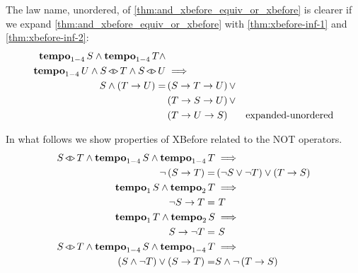 \documentclass[12pt,openright,twoside,a4paper,oldfontcommands,english,brazil,final]{abntex2}
\theoremstyle{theo}
\def\xbeforeop{\ensuremath\rightarrow}
\newcommand{\xbefore}[2]{\ensuremath #1 \xbeforeop #2 }
\def\tempoop{\ensuremath\operatorname{\mathbf{tempo}}}
\newcommand{\tempo}[2][1-4]{\ensuremath\tempoop_{#1} #2}
\def\independenteventsop{\ensuremath\operatorname{\triangleleft\triangleright}}
\newcommand{\independentevents}[2]{\ensuremath #1 \independenteventsop #2}
\newcommand{\parsin}[1]{\ensuremath\left( #1 \right)}
\def\inter{\ensuremath\operatorname{\cap}}
\begin{document}
The law name, unordered, of \cref{thm:and_xbefore_equiv_or_xbefore} is clearer if we expand \cref{thm:and_xbefore_equiv_or_xbefore} with \cref{thm:xbefore-inf-1} and  \cref{thm:xbefore-inf-2}:
%
\begin{align}
\tempo{S} \land \tempo{T} \land \nonumber\\
  \tempo{U} \land \independentevents{S}{T} \land \independentevents{S}{U} & \implies \nonumber\\
  S \land \parsin{\xbefore{T}{U}} = &
  \parsin{\xbefore{\xbefore{S}{T}}{U}} \lor \nonumber\\
  & \parsin{\xbefore{\xbefore{T}{S}}{U}} \lor \nonumber\\
  & \parsin{\xbefore{\xbefore{T}{U}}{S}} &
  \text{expanded-unordered}
  \label{thm:and_xbefore_equiv_or_xbefore_expanded}
%
%
%
\end{align}
%

In what follows we show properties of \ac{XBefore} related to the \ac{NOT} operators.
%
\begin{subequations}
\label{thms:xbefore-not}
\begin{align}
\independentevents{S}{T} \land
\tempo[1-4]{S} \land \tempo[1-4]{T} & \implies \nonumber\\
  \lnot \left(\xbefore{S}{T}\right) =&
  \left(\lnot S \lor \lnot T\right) \lor \left(\xbefore{T}{S}\right)
  \label{thm:not_xbefore}\\
\tempo[1]{S} \land \tempo[2]{T} & \implies \nonumber\\
  \xbefore{\lnot S}{T} = &~ T\label{thm:not_1_xbefore_equiv}\\
\tempo[1]{T} \land \tempo[2]{S} & \implies \nonumber\\
  \xbefore{S}{\lnot T} = &~ S\label{thm:not_2_xbefore_equiv}\\
\independentevents{S}{T} \land \tempo[1-4]{S} \land \tempo[1-4]{T} & \implies\nonumber\\
  \left(S \land \lnot T\right) \lor \left(\xbefore{S}{T}\right) = &
  S \land \lnot\left(\xbefore{T}{S} \right)
  \label{thm:xbefore_sup_compl_inf_absorb1}
\end{align}
\end{subequations}
\end{document}
